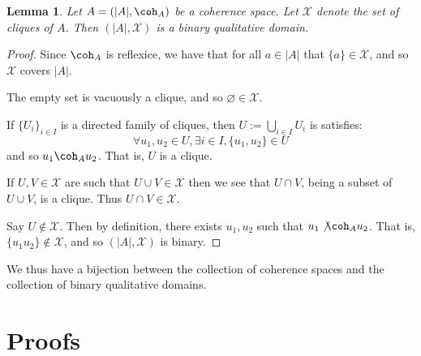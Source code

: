 \documentclass[12pt]{article}
\theoremstyle{plain}
\newtheorem{lemma}[thm]{Lemma}
\theoremstyle{definition}
\newcommand{\scr}[1]{\mathscr{#1}}
\begin{document}
	\begin{lemma}
		Let $A = (|A|, \coh_A)$ be a coherence space. Let $\scr{X}$ denote the set of cliques of $A$. Then $(|A|, \scr{X})$ is a binary qualitative domain.
		\end{lemma}
	\begin{proof}
		Since $\coh_A$ is reflexice, we have that for all $a \in |A|$ that $\{ a \} \in \scr{X}$, and so $\scr{X}$ covers $|A|$.
		
		The empty set is vacuously a clique, and so $\varnothing \in \scr{X}$.
		
		If $\{ U_i \}_{i \in I}$ is a directed family of cliques, then $U := \bigcup_{i \in I}U_i$ is satisfies:
		\begin{equation}
			\forall u_1, u_2 \in U, \exists i \in I, \{ u_1, u_2 \} \in U
			\end{equation}
		and so $u_1 \coh_A u_2$. That is, $U$ is a clique.
		
		If $U,V \in \scr{X}$ are such that $U \cup V \in \scr{X}$ then we see that $U \cap V$, being a subset of $U \cup V$, is a clique. Thus $U \cap V \in \scr{X}$.
		
		Say $U \not\in \scr{X}$. Then by definition, there exists $u_1, u_2$ such that $u_1 \not\coh_A u_2$. That is, $\{ u_1 u_2 \} \not\in \scr{X}$, and so $(|A|,\scr{X})$ is binary.
		\end{proof}
	We thus have a bijection between the collection of coherence spaces and the collection of binary qualitative domains.

\appendix
\section{Proofs}
\end{document}
